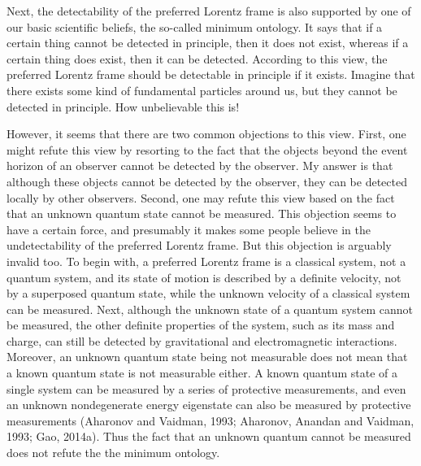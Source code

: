 Next, the detectability of the preferred Lorentz frame is also supported by one of our basic scientific beliefs, the so-called minimum ontology. It says that if a certain thing cannot be detected in principle, then it does not exist, whereas if a certain thing does exist, then it can be detected. According to this view, the preferred Lorentz frame should be detectable in principle if it exists. Imagine that there exists some kind of fundamental particles around us, but they cannot be detected in principle. How unbelievable this is! 

However, it seems that there are two common objections to this view. First, one might refute this view by resorting to the fact that the objects beyond the event horizon of an observer cannot be detected by the observer. My answer is that although these objects cannot be detected by the observer, they can be detected locally by other observers. Second, one may refute this view based on the fact that an unknown quantum state cannot be measured. This objection seems to have a certain force, and presumably it makes some people believe in the undetectability of the preferred Lorentz frame. But this objection is arguably invalid too. To begin with, a preferred Lorentz frame is a classical system, not a quantum system, and its state of motion is described by a definite velocity, not by a superposed quantum state, while the unknown velocity of a classical system can be measured. Next, although the unknown state of a quantum system cannot be measured, the other definite properties of the system, such as its mass and charge, can still be detected by gravitational and electromagnetic interactions. Moreover, an unknown quantum state being not measurable does not mean that a known quantum state is not measurable either. A known quantum state of a single system can be measured by a series of protective measurements, and even an unknown nondegenerate energy eigenstate can also be measured by protective measurements (Aharonov and Vaidman, 1993; Aharonov, Anandan and Vaidman, 1993; Gao, 2014a). Thus the fact that an unknown quantum cannot be measured does not refute the the minimum ontology. 

